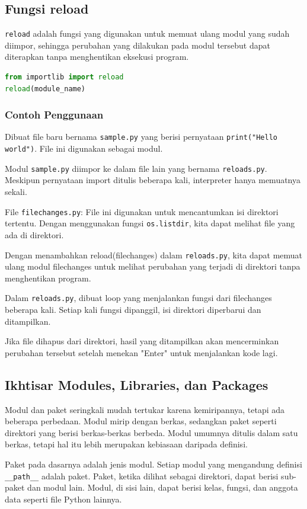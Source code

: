 \documentclass{article}
\begin{document}
\subsection{Fungsi reload}
\verb|reload| adalah fungsi yang digunakan untuk memuat ulang modul yang sudah diimpor, sehingga perubahan yang dilakukan pada modul tersebut dapat diterapkan tanpa menghentikan eksekusi program.
\begin{lstlisting}[language=Python, caption={}, captionpos=b]
from importlib import reload
reload(module_name)
\end{lstlisting}

\subsubsection{Contoh Penggunaan}
Dibuat file baru bernama \verb|sample.py| yang berisi pernyataan \verb|print("Hello world")|. File ini digunakan sebagai modul.

Modul \verb|sample.py| diimpor ke dalam file lain yang bernama \verb|reloads.py|. Meskipun pernyataan import ditulis beberapa kali, interpreter hanya memuatnya sekali.

File \verb|filechanges.py|: File ini digunakan untuk mencantumkan isi direktori tertentu. Dengan menggunakan fungsi \verb|os.listdir|, kita dapat melihat file yang ada di direktori.

Dengan menambahkan reload(filechanges) dalam \verb|reloads.py|, kita dapat memuat ulang modul filechanges untuk melihat perubahan yang terjadi di direktori tanpa menghentikan program.

Dalam \verb|reloads.py|, dibuat loop yang menjalankan fungsi dari filechanges beberapa kali. Setiap kali fungsi dipanggil, isi direktori diperbarui dan ditampilkan.

Jika file dihapus dari direktori, hasil yang ditampilkan akan mencerminkan perubahan tersebut setelah menekan "Enter" untuk menjalankan kode lagi.

\subsection{Ikhtisar Modules, Libraries, dan Packages}
Modul dan paket seringkali mudah tertukar karena kemiripannya, tetapi ada beberapa perbedaan. Modul mirip dengan berkas, sedangkan paket seperti direktori yang berisi berkas-berkas berbeda. Modul umumnya ditulis dalam satu berkas, tetapi hal itu lebih merupakan kebiasaan daripada definisi.

Paket pada dasarnya adalah jenis modul. Setiap modul yang mengandung definisi \verb|__path__| adalah paket. Paket, ketika dilihat sebagai direktori, dapat berisi sub-paket dan modul lain. Modul, di sisi lain, dapat berisi kelas, fungsi, dan anggota data seperti file Python lainnya.
\end{document}
